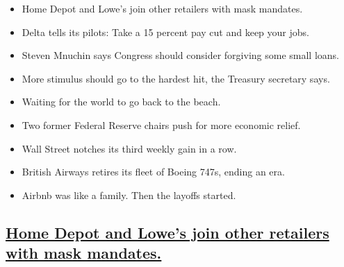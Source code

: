 \begin{itemize}
\item
  \protect\hyperlink{home-depot-and-lowes-join-other-retailers-with-mask-mandates}{}

  Home Depot and Lowe's join other retailers with mask mandates.
\item
  \protect\hyperlink{delta-tells-its-pilots-take-a-15-percent-pay-cut-and-keep-your-jobs.html}{}

  Delta tells its pilots: Take a 15 percent pay cut and keep your jobs.
\item
  \protect\hyperlink{steven-mnuchin-says-congress-should-consider-forgiving-some-small-loans}{}

  Steven Mnuchin says Congress should consider forgiving some small
  loans.
\item
  \protect\hyperlink{more-stimulus-should-go-to-the-hardest-hit-the-treasury-secretary-says}{}

  More stimulus should go to the hardest hit, the Treasury secretary
  says.
\item
  \protect\hyperlink{waiting-for-the-world-to-go-back-to-the-beach}{}

  Waiting for the world to go back to the beach.
\item
  \protect\hyperlink{two-former-federal-reserve-chairs-push-for-more-economic-relief}{}

  Two former Federal Reserve chairs push for more economic relief.
\item
  \protect\hyperlink{wall-street-notches-its-third-weekly-gain-in-a-row}{}

  Wall Street notches its third weekly gain in a row.
\item
  \protect\hyperlink{british-airways-retires-its-fleet-of-boeing-747s-ending-an-era}{}

  British Airways retires its fleet of Boeing 747s, ending an era.
\item
  \protect\hyperlink{airbnb-was-like-a-family-then-the-layoffs-started}{}

  Airbnb was like a family. Then the layoffs started.
\end{itemize}

\hypertarget{home-depot-and-lowes-join-other-retailers-with-mask-mandates}{%
\subsection{\texorpdfstring{\protect\hyperlink{home-depot-and-lowes-join-other-retailers-with-mask-mandates}{Home
Depot and Lowe's join other retailers with mask
mandates.}}{Home Depot and Lowe's join other retailers with mask mandates.}}\label{home-depot-and-lowes-join-other-retailers-with-mask-mandates}}

